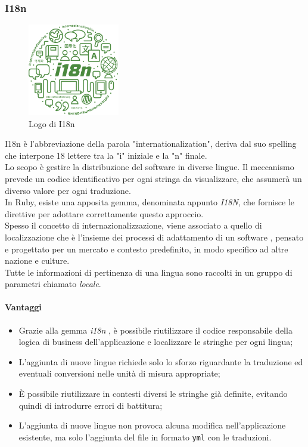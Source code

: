 \subsubsection{I18n}
	\begin{figure}[H]
		\begin{center}
			\includegraphics[width=4cm]{Pics/i8n-logo.png}
			\caption{Logo di I18n}
			\label{fig:I18NLogo}
		\end{center}
	\end{figure}
	I18n è l'abbreviazione della parola "internationalization", deriva dal suo spelling che interpone 18 lettere tra la "i" iniziale e la "n" finale. \\ 
	Lo scopo è gestire la distribuzione del software in diverse lingue. Il meccanismo prevede un codice identificativo per ogni stringa da visualizzare, che assumerà un diverso valore per ogni traduzione. \\
	In Ruby, esiste una apposita gemma, denominata appunto \textit{I18N}, che fornisce le direttive per adottare correttamente questo approccio. \\
	Spesso il concetto di internazionalizzazione, viene associato a quello di localizzazione che è l'insieme dei processi di adattamento di un software , pensato e progettato per un mercato e contesto predefinito, in modo specifico ad altre nazione e culture. \\
	Tutte le informazioni di pertinenza di una lingua sono raccolti in un gruppo di parametri chiamato \textit{locale}.
\paragraph{Vantaggi}
	\begin{itemize}
		\item Grazie alla gemma \textit{i18n} , è possibile riutilizzare il codice responsabile della logica di business dell'applicazione e localizzare le stringhe per ogni lingua;
		\item L'aggiunta di nuove lingue richiede solo lo sforzo riguardante la traduzione ed eventuali conversioni nelle unità di misura appropriate;
		\item È possibile riutilizzare in contesti diversi le stringhe già definite, evitando quindi di introdurre errori di battitura;
		\item L'aggiunta di nuove lingue non provoca alcuna modifica nell'applicazione esistente, ma solo l'aggiunta del file in formato \texttt{yml} con le traduzioni.
	\end{itemize}
